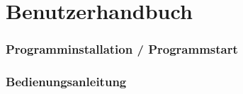 \part{Benutzerhandbuch}
%
\section{Programminstallation / Programmstart}
\section{Bedienungsanleitung}